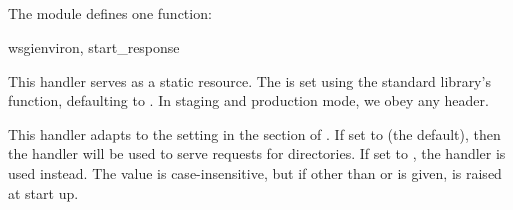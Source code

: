 \subsection{}
\label{api-handlers-static}

The  module defines one function:

\begin{funcdesc}{wsgi}{environ, start_response}

This handler serves  as a static resource. The
 is set using the standard library's
 function, defaulting to . In
staging and production mode, we obey any  header.

This handler adapts to the  setting in the \code{[static]}
section of . If set to  (the default), then the
 handler will be used to serve requests for
directories. If set to , the  handler
is used instead. The  value is case-insensitive, but if other
than  or  is given,  is raised at start
up.

\end{funcdesc}
